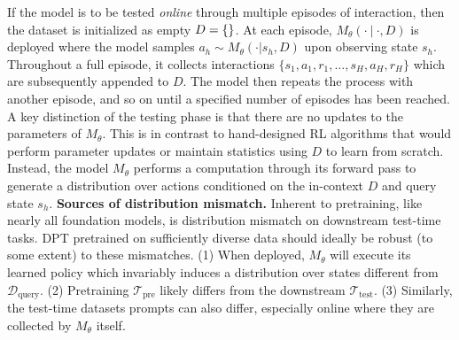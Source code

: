 \documentclass{article}
\newcommand{\Dcal}{\mathcal{D}}
\newcommand{\Tcal}{{\mathcal{T}}}
\newcommand{\pretraint}{\Tcal_{\text{pre}}}
\newcommand{\testt}{\Tcal_{\text{test}}}
\newcommand{\Dquery}{\Dcal_{\text{query}}}
\begin{document}
If the model is to be tested \emph{online} through multiple episodes of interaction, then the dataset is initialized as empty $D = \{\empty\}$. At each episode, $M_{\theta}(\cdot \ | \ \cdot, D)$ is deployed where the model samples $a_h \sim M_{\theta}(\cdot  |s_h, D)$ upon observing state $s_h$. Throughout a full episode, it collects interactions $\{s_1, a_1, r_1, \ldots, s_H, a_H, r_H\}$ which are subsequently appended to $D$. The model then repeats the process with another episode, and so on until a specified number of episodes has been reached.
A key distinction of the testing phase is that there are no updates to the parameters of $M_\theta$.
This is in contrast to hand-designed RL algorithms that would perform parameter updates or maintain statistics using  $D$ to learn from scratch. Instead, the model $M_{\theta}$ performs a computation through its forward pass to generate a distribution over actions conditioned on the in-context $D$ and query state $s_h$.
\textbf{Sources of distribution mismatch.}
Inherent to pretraining, like nearly all foundation models, is distribution mismatch on downstream test-time tasks. DPT pretrained on sufficiently diverse data should ideally be robust (to some extent) to these mismatches. (1) When deployed, $M_{\theta}$ will execute its learned policy which invariably induces a distribution over states different from $\Dquery$. (2) Pretraining $\pretraint$ likely differs from the downstream $\testt$. (3) Similarly, the test-time datasets prompts can also differ, especially online where they are collected by $M_{\theta}$ itself.
\end{document}
